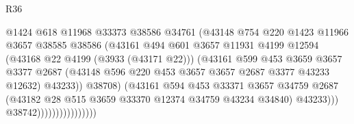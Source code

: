 \begin{lexlean}{R36}
\begin{coremodule}
                                        @1424
                                        @618
                                        @11968
                                        @33373
                                        @38586
                                        @34761
                                        (@43148
                                          @754
                                          @220
                                          @1423
                                          @11966
                                          @3657
                                          @38585
                                          @38586
                                          (@43161
                                            @494
                                            @601
                                            @3657
                                            @11931
                                            @4199
                                            @12594
                                            (@43168 @22 @4199 (@3933 (@43171 @22)))
                                            (@43161
                                              @599
                                              @453
                                              @3659
                                              @3657
                                              @3377
                                              @2687
                                              (@43148
                                                @596
                                                @220
                                                @453
                                                @3657
                                                @3657
                                                @2687
                                                @3377
                                                @43233
                                                @12632)
                                              @43233))
                                          @38708)
                                        (@43161
                                          @594
                                          @453
                                          @33371
                                          @3657
                                          @34759
                                          @2687
                                          (@43182 @28 @515 @3659 @33370 @12374 @34759 @43234 @34840)
                                          @43233)))
                                    @38742))))))))))))))))

\end{coremodule}
\end{lexlean}
